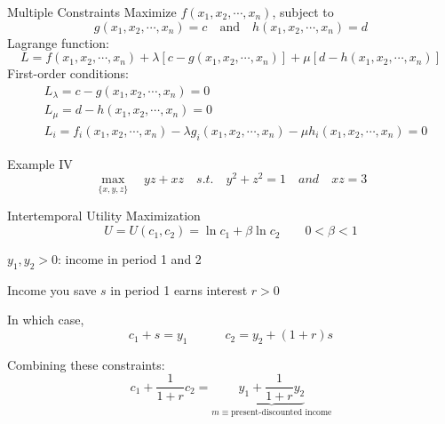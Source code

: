 \documentclass{./../../Latex/teaching_slides}
\begin{document}
\begin{frame}{Multiple Constraints}
Maximize $f\left(x_{1}, x_{2}, \cdots, x_{n}\right)$, subject to 
$$
g\left(x_{1}, x_{2}, \cdots, x_{n}\right)=c \quad \text{and} \quad h\left(x_{1}, x_{2}, \cdots, x_{n}\right)=d
$$
Lagrange function:
$$
L=f\left(x_{1}, x_{2}, \cdots, x_{n}\right)+\lambda\left[c-g\left(x_{1}, x_{2}, \cdots, x_{n}\right)\right]+\mu\left[d-h\left(x_{1}, x_{2}, \cdots, x_{n}\right)\right]
$$
First-order conditions:
$$
\begin{aligned}
&L_{\lambda}=c-g\left(x_{1}, x_{2}, \cdots, x_{n}\right)=0 \\
&L_{\mu}=d-h\left(x_{1}, x_{2}, \cdots, x_{n}\right)=0 \\
&L_{i}=f_{i}\left(x_{1}, x_{2}, \cdots, x_{n}\right)-\lambda g_{i}\left(x_{1}, x_{2}, \cdots, x_{n}\right)-\mu h_{i}\left(x_{1}, x_{2}, \cdots, x_{n}\right)=0 
\end{aligned}
$$
\end{frame}

\begin{frame}{Example IV}
\vspace{-2em}
$$ \max_{\{x,y,z\}} \quad yz + xz \quad s.t. \quad y^2+z^2=1 \quad and \quad  xz=3 $$
\end{frame}

\begin{frame}{Intertemporal Utility Maximization}
\vspace{-1.25em}
$$ 	U = U(c_1, c_2) =  \ln c_1 + \beta \ln c_2 \quad \quad 0<\beta<1$$
\vspace{-0.65em}

\begin{witemize}
  \item $y_1,y_2>0$: income in period 1 and 2
  \item Income you save $s$ in period 1 earns interest $r>0$
  \item In which case,
 $$ c_1 + s = y_1 \quad \quad \quad  c_2 = y_2 + (1+r) s $$
 \item Combining these constraints:
$$ c_1 + \frac{1}{1+r} c_2 = \underbrace{y_1 + \frac{1}{1+r} y_2}_{m \equiv \text{present-discounted income}}$$
\end{witemize}
\end{frame}
\end{document}
